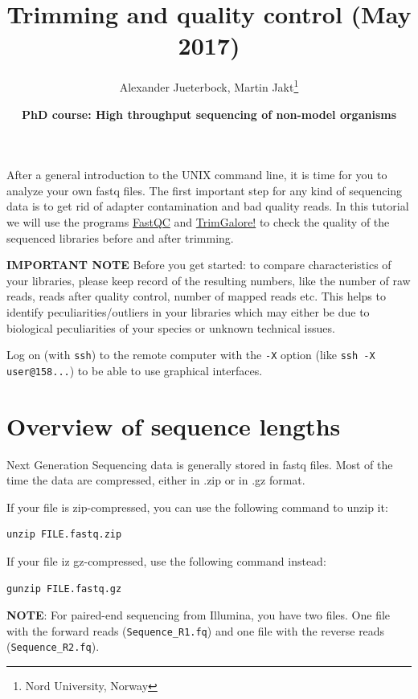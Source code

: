 \documentclass[11pt]{article}
\author{Alexander Jueterbock, Martin Jakt\thanks{Nord University, Norway}}
\date{\textbf{PhD course: High throughput sequencing of non-model organisms}}
\title{\textbf{Trimming and quality control} (May 2017)}
\begin{document}
\maketitle
\tableofcontents

After a general introduction to the UNIX command line, it is time for
you to analyze your own fastq files. The first important step for any
kind of sequencing data is to get rid of adapter contamination and 
bad quality reads. In this tutorial we will use the programs \href{http://www.bioinformatics.babraham.ac.uk/projects/fastqc/}{FastQC}
and \href{http://www.bioinformatics.babraham.ac.uk/projects/trim_galore/}{TrimGalore!} to check the quality of the sequenced libraries before
and after trimming.


\textbf{IMPORTANT NOTE} Before you get started: to compare characteristics of
your libraries, please keep record of the resulting numbers, like the
number of raw reads, reads after quality control, number of mapped
reads etc. This helps to identify peculiarities/outliers in your
libraries which may either be due to biological peculiarities of your
species or unknown technical issues.


Log on (with \texttt{ssh}) to the remote computer with the \texttt{-X} option (like
\texttt{ssh -X user@158...}) to be able to use graphical interfaces.

\section{Overview of sequence lengths}
\label{sec:orgheadline1}
Next Generation Sequencing data is generally stored in fastq
files. Most of the time the data are compressed, either in .zip or in
.gz format.

If your file is zip-compressed, you can use the following command to unzip it:

\begin{verbatim}
unzip FILE.fastq.zip
\end{verbatim}

If your file iz gz-compressed, use the following command instead:

\begin{verbatim}
gunzip FILE.fastq.gz
\end{verbatim}

\textbf{NOTE}: For paired-end sequencing from Illumina, you have two
files. One file with the forward reads (\texttt{Sequence\_R1.fq}) and one file with
the reverse reads (\texttt{Sequence\_R2.fq}).
\end{document}
